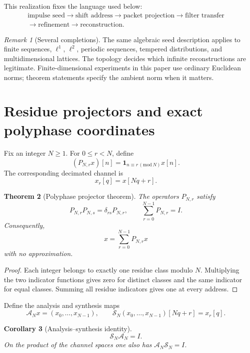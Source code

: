 \documentclass[11pt]{article}
\newtheorem{theorem}{Theorem}[section]
\newtheorem{corollary}[theorem]{Corollary}
\theoremstyle{definition}
\theoremstyle{remark}
\newtheorem{remark}[theorem]{Remark}
\newcommand{\cA}{\mathcal A}
\newcommand{\cS}{\mathcal S}
\begin{document}
This realization fixes the language used below:
\[
\begin{gathered}
\text{impulse seed}\longrightarrow\text{shift address}\longrightarrow\text{packet projection}\longrightarrow\text{filter transfer}\\
\longrightarrow\text{refinement}\longrightarrow\text{reconstruction}.
\end{gathered}
\]

\begin{remark}[Several completions]
The same algebraic seed description applies to finite sequences, $\ell^1$, $\ell^2$, periodic sequences, tempered distributions, and multidimensional lattices. The topology decides which infinite reconstructions are legitimate. Finite-dimensional experiments in this paper use ordinary Euclidean norms; theorem statements specify the ambient norm when it matters.
\end{remark}

\section{Residue projectors and exact polyphase coordinates}

Fix an integer $N\ge1$. For $0\le r<N$, define
\[
(P_{N,r}x)[n]
=
\mathbf 1_{n\equiv r\, (\mathrm{mod}\,N)}x[n].
\]
The corresponding decimated channel is
\[
x_r[q]=x[Nq+r].
\]

\begin{theorem}[Polyphase projector theorem]
The operators $P_{N,r}$ satisfy
\[
P_{N,r}P_{N,s}=\delta_{rs}P_{N,r},
\qquad
\sum_{r=0}^{N-1}P_{N,r}=I.
\]
Consequently,
\[
\boxed{x=\sum_{r=0}^{N-1}P_{N,r}x}
\]
with no approximation.
\end{theorem}

\begin{proof}
Each integer belongs to exactly one residue class modulo $N$. Multiplying the two indicator functions gives zero for distinct classes and the same indicator for equal classes. Summing all residue indicators gives one at every address.
\end{proof}

Define the analysis and synthesis maps
\[
\cA_Nx=(x_0,\ldots,x_{N-1}),
\qquad
\cS_N(x_0,\ldots,x_{N-1})[Nq+r]=x_r[q].
\]

\begin{corollary}[Analysis--synthesis identity]
\[
\boxed{\cS_N\cA_N=I.}
\]
On the product of the channel spaces one also has $\cA_N\cS_N=I$.
\end{corollary}
\end{document}
